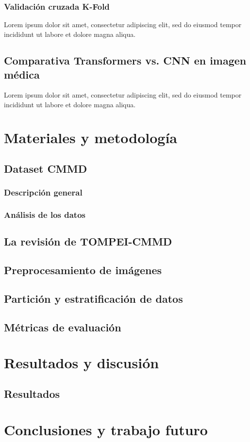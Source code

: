 \documentclass[a4paper,10pt]{book}
\begin{document}
\subsection{Validación cruzada K-Fold}
Lorem ipsum dolor sit amet, consectetur adipiscing elit, sed do eiusmod tempor incididunt ut labore et dolore magna aliqua.
\section{Comparativa Transformers vs. CNN en imagen médica}
Lorem ipsum dolor sit amet, consectetur adipiscing elit, sed do eiusmod tempor incididunt ut labore et dolore magna aliqua.




\chapter{Materiales y metodología}
\section{Dataset CMMD}
\subsection{Descripción general}
\subsection{Análisis de los datos}
\section{La revisión de TOMPEI-CMMD}
\section{Preprocesamiento de imágenes}
\section{Partición y estratificación de datos}
\section{Métricas de evaluación}


\chapter{Resultados y discusión}
\section{Resultados}

\chapter{Conclusiones y trabajo futuro}

\backmatter
{}


\end{document}

